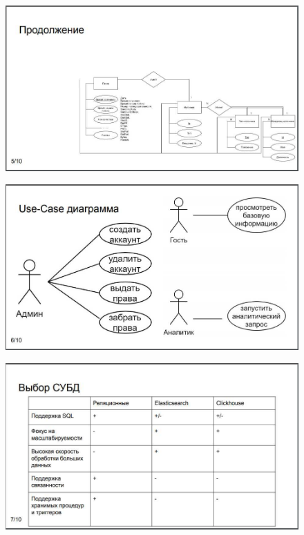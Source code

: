 \begin{figure}[H]
	\centering
	\includegraphics[scale=0.35]{pr5.jpg}
\end{figure}
\begin{figure}[H]
	\centering
	\includegraphics[scale=0.35]{pr6.jpg}
\end{figure}
\begin{figure}[H]
	\centering
	\includegraphics[scale=0.35]{pr7.jpg}
\end{figure}
